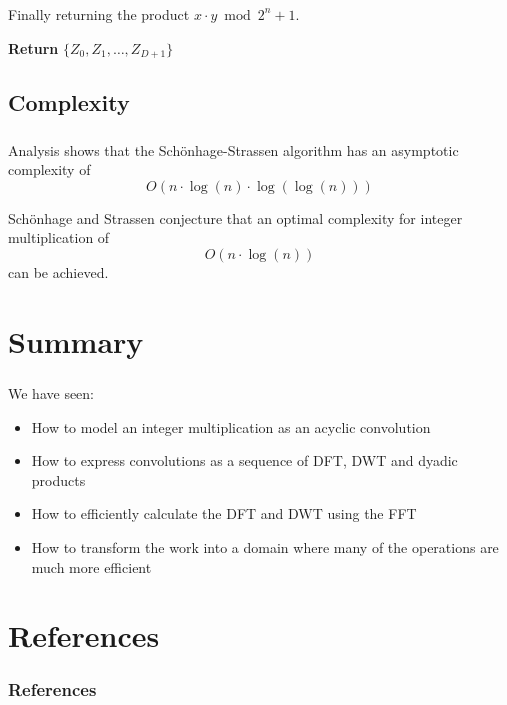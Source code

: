 \documentclass{beamer}
\begin{document}
\begin{frame}
		\frametitle{\secname}
		\framesubtitle{\subsecname}

		Finally returning the product $x \cdot y \bmod 2^n + 1$.

		\begin{algorithmic}[1]
				\State \textbf{Return} $\{Z_0, Z_1, \ldots, Z_{D+1}\}$ 
				\EndFunction
		\end{algorithmic}
\end{frame}

\subsection{Complexity}

\begin{frame}
		\frametitle{\secname}
		\framesubtitle{\subsecname}

		Analysis shows that the Schönhage-Strassen algorithm has an asymptotic
		complexity of
		\[
				O(n \cdot \log(n) \cdot \log(\log(n)))
		\]

		Schönhage and Strassen conjecture that an optimal complexity for integer multiplication of
		\[
				O(n \cdot \log(n))
		\]
		can be achieved.


\end{frame}

\section{Summary}

\begin{frame}
		\frametitle{\secname}

		We have seen:
		\begin{itemize}
				\item How to model an integer multiplication as an acyclic convolution
				\item How to express convolutions as a sequence of DFT, DWT and dyadic products
				\item How to efficiently calculate the DFT and DWT using the FFT
				\item How to transform the work into a domain where many of the
						operations are much more efficient
		\end{itemize}
\end{frame}

\section{References}

\begin{frame}[allowframebreaks]
		\frametitle{References}
		\printbibliography
\end{frame}
\end{document}
